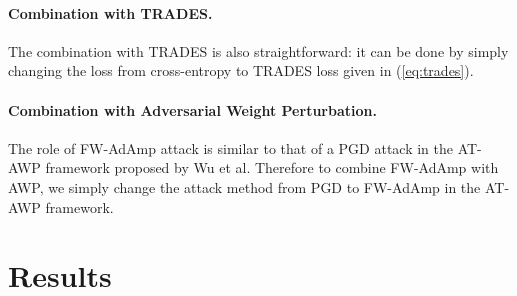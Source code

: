\documentclass{article}
\begin{document}
        \paragraph{Combination with TRADES.} The combination with TRADES is also straightforward: it can be done by simply changing the loss from cross-entropy to TRADES loss given in (\ref{eq:trades}).

        \paragraph{Combination with Adversarial Weight Perturbation.} The role of FW-AdAmp attack is similar to that of a PGD attack in the AT-AWP framework proposed by Wu et al. Therefore to combine FW-AdAmp with AWP, we simply change the attack method from PGD to FW-AdAmp in the AT-AWP framework.


\section{Results}\label{sec:Results}
\end{document}
